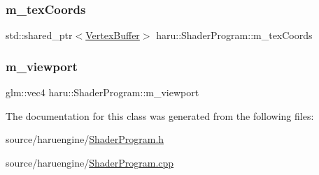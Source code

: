 \subsubsection{\texorpdfstring{m\+\_\+tex\+Coords}{m\_texCoords}}
{\footnotesize\ttfamily std\+::shared\+\_\+ptr$<$\mbox{\hyperlink{classharu_1_1_vertex_buffer}{Vertex\+Buffer}}$>$ haru\+::\+Shader\+Program\+::m\+\_\+tex\+Coords\hspace{0.3cm}{\ttfamily [private]}}

\mbox{\label{classharu_1_1_shader_program_a2eb3daf1a2dc547187d934a5db92ab6a}} 
\subsubsection{\texorpdfstring{m\+\_\+viewport}{m\_viewport}}
{\footnotesize\ttfamily glm\+::vec4 haru\+::\+Shader\+Program\+::m\+\_\+viewport\hspace{0.3cm}{\ttfamily [private]}}



The documentation for this class was generated from the following files\+:\begin{DoxyCompactItemize}
\item 
source/haruengine/\mbox{\hyperlink{_shader_program_8h}{Shader\+Program.\+h}}\item 
source/haruengine/\mbox{\hyperlink{_shader_program_8cpp}{Shader\+Program.\+cpp}}\end{DoxyCompactItemize}
